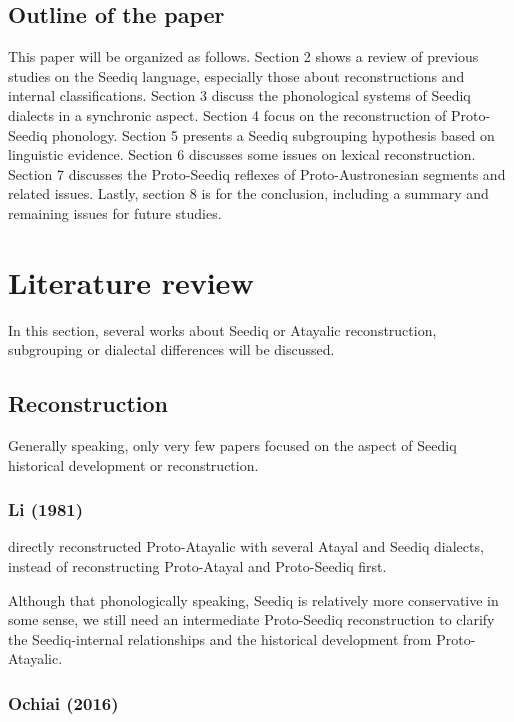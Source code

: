 \documentclass[12pt]{article}
\newcommand{\panf}{Proto-Austronesian\xspace}
\newcommand{\psedf}{Proto-Seediq\xspace}
\begin{document}
\subsection{Outline of the paper}

This paper will be organized as follows. Section 2 shows a review of previous studies on the Seediq language, especially those about reconstructions and internal classifications. Section 3 discuss the phonological systems of Seediq dialects in a synchronic aspect. Section 4 focus on the reconstruction of \psedf phonology. Section 5 presents a Seediq subgrouping hypothesis based on linguistic evidence. Section 6 discusses some issues on lexical reconstruction. Section 7 discusses the \psedf reflexes of \panf segments and related issues. Lastly, section 8 is for the conclusion, including a summary and remaining issues for future studies. 

\section{Literature review}

In this section, several works about Seediq or Atayalic reconstruction, subgrouping or dialectal differences will be discussed. 

\subsection{Reconstruction}

Generally speaking, only very few papers focused on the aspect of Seediq historical development or reconstruction.

\subsubsection{Li (1981)}

\textcite{li1981paic} directly reconstructed Proto-Atayalic with several Atayal and Seediq dialects, instead of reconstructing Proto-Atayal and Proto-Seediq first. 

Although that phonologically speaking, Seediq is relatively more conservative in some sense, we still need an intermediate \psedf reconstruction to clarify the Seediq-internal relationships and the historical development from Proto-Atayalic. 

\subsubsection{Ochiai (2016)}
\end{document}
